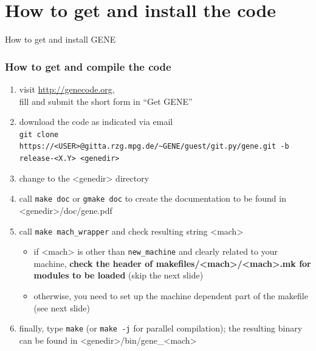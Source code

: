 \documentclass[9pt]{beamer}
\begin{document}
\section{How to get and install the code}

\begin{frame}[plain]

\begin{center}

\begin{exampleblock}

\begin{center}
\LARGE
How to get and install GENE
\end{center}
\end{exampleblock}

\end{center}
\end{frame}


\begin{frame}
  \frametitle{How to get and compile the code}

\begin{block}{}
 \begin{enumerate}
  \item visit \url{http://genecode.org},\\
fill and submit the short form in ``Get GENE''\\[1ex]
  \item download the code as indicated via email\\
{\tt \tiny git clone https://<USER>@gitta.rzg.mpg.de/\textasciitilde GENE/guest/git.py/gene.git -b release-<X.Y> <genedir>}\\[1ex]
  \item change to the <genedir> directory\\[1ex]
  \item call {\tt make doc} or {\tt gmake doc} to create the documentation to be found in <genedir>/doc/gene.pdf\\[1ex]
  \item call {\tt make mach\_wrapper} and check resulting string <mach>
\begin{itemize}
 \item if <mach> is other than {\tt new\_machine} and clearly related to your machine, {\bf check the header of makefiles/<mach>/<mach>.mk for modules to be loaded} (skip the next slide)
 \item otherwise, you need to set up the machine dependent part of the makefile (see next slide)
\end{itemize}
 \item finally, type {\tt make} (or {\tt make -j} for parallel compilation); the resulting binary can be found in <genedir>/bin/gene\_<mach>
 \end{enumerate}
\end{block}


\end{frame}
\end{document}
